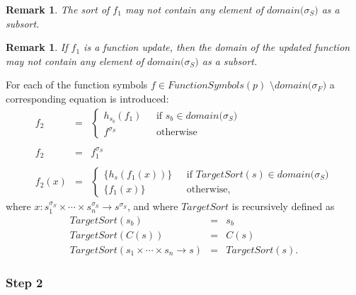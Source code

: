 \documentclass{article}
\newtheorem{remark}[theorem]{Remark}
\begin{document}
\begin{remark}
The sort of $f_{1}$ may not contain any element of $domain(\sigma _{S}%
\mathcal{)}$ as a subsort.
\end{remark}

\begin{remark}
If $f_{1}$ is a function update, then the domain of the updated function may
not contain any element of $domain(\sigma _{S}\mathcal{)}$ as a subsort.
\end{remark}

For each of the function symbols $f\in FunctionSymbols(p)$ $\setminus
domain(\sigma _{F}\mathcal{)}$ a corresponding equation is introduced:%
\begin{equation*}
\begin{array}{lcl}
f_{2} & = & \left\{ 
\begin{array}{ll}
h_{s_{b}}(f_{1})\text{ } & \text{if }s_{b}\in domain(\sigma _{S}\mathcal{)}
\\ 
f^{\sigma _{S}} & \text{otherwise}%
\end{array}%
\right. \\ 
&  &  \\ 
f_{2} & = & f_{1}^{\sigma _{S}} \\ 
&  &  \\ 
f_{2}(x) & = & \left\{ 
\begin{array}{ll}
\{h_{s}(f_{1}(x))\}\text{ } & \text{if }TargetSort(s)\in domain(\sigma _{S}%
\mathcal{)} \\ 
\{f_{1}(x)\} & \text{otherwise,}%
\end{array}%
\right.%
\end{array}%
\end{equation*}%
where $x:s_{1}^{\sigma _{S}}\times \cdots \times s_{n}^{\sigma
_{S}}\rightarrow s^{\sigma _{S}}$, and where $TargetSort$ is recursively
defined as%
\begin{equation*}
\begin{array}{lcl}
TargetSort(s_{b}) & = & s_{b} \\ 
TargetSort(C(s)) & = & C(s) \\ 
TargetSort(s_{1}\times \cdots \times s_{n}\rightarrow s) & = & TargetSort(s).%
\end{array}%
\end{equation*}

\subsubsection{Step 2}
\end{document}
